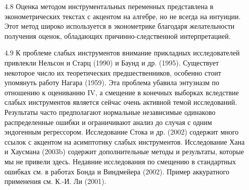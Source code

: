 \begin{itemize}
\item [$4.8$] Оценка методом инструментальных переменных представлена в эконометрических текстах с акцентом на алгебре, но не всегда на интуиции. Этот метод широко используется в эконометрике благодаря желательности получения оценок, обладающих причинно-следственной интерпретацией.
\item [$4.9$] К проблеме слабых инструментов внимание прикладных исследователей привлекли Нельсон и Старц (1990) и Баунд и др. (1995). Существует некоторое число их теоретических предшественников, особенно стоит упомянуть работу Нагара (1959). Эта проблема убавила энтузиазм по отношению к оцениванию IV, а смещение в конечных выборках вследствие слабых инструментов является сейчас очень активной темой исследований. Результаты часто предполагают нормальные независимые одинаково распределенные ошибки и ограничивают анализ до случая с одним эндогенным регрессором. Исследование Стока и др. (2002)  содержит много ссылок с акцентом на асимптотику слабых инструментов. Исследование Хана и Хаусмана (2003b) содержит дополнительные методы и результаты, которые мы не привели здесь. Недавние исследования по смещению в стандартных ошибках см. в работах Бонда и Виндмейера (2002). Пример аккуратного применения см. К.-И. Ли (2001).
\end{itemize}

